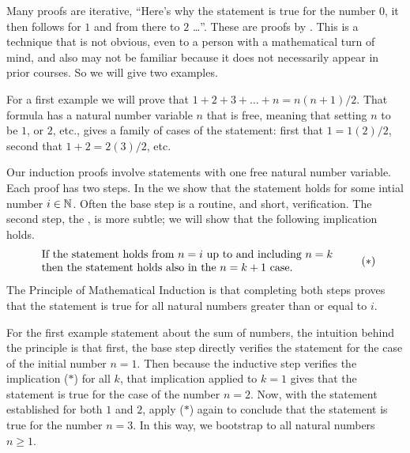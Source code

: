 
Many proofs are iterative,
``Here's why the statement is true for the number \( 0 \), 
it then follows for \( 1 \) and from there to \( 2 \) \ldots''.
These are proofs by 
.
This is a technique that is not obvious, even to a 
person with a mathematical turn of mind, and also may not be familiar because
it does not necessarily appear in prior courses.
So we will give two examples.

For a first example we will prove that \( 1+2+3+\dots+n=n(n+1)/2 \). 
That formula has a natural number variable $n$
that is free, meaning that setting $n$ to be $1$,
or $2$, etc., gives a family of cases of the statement:
first that $1=1(2)/2$, second that $1+2=2(3)/2$, etc.

Our induction proofs involve statements with one free natural number 
variable.
Each proof has two steps. 
In the 
we show that the statement holds for
some intial number $i\in \mathbb{N}$. 
Often the base step is a routine, and short, verification.
The second step, 
the ,
is more subtle; we will show that the following implication holds.
\begin{equation*}
  \begin{tabular}{l}
    \text{If the statement holds from $n=i$ up to and including~$n=k$} 
     \\
    \text{then the statement holds also in the $n=k+1$ case.}
  \end{tabular}
  \tag{$*$}
\end{equation*}
The Principle of Mathematical Induction
is that completing both steps proves that the statement is
true for all natural numbers greater than or equal to $i$.

For the first example statement about the sum of numbers, 
the intuition behind the principle is that first, the base step directly 
verifies the statement for the case of the initial number $n=1$. 
Then because the inductive step verifies the implication ($*$)
for all $k$, that implication applied to $k=1$
gives that the statement is true for the case of the number
$n=2$. 
Now, with the statement established for both $1$ and $2$, 
apply ($*$) again to conclude that the statement is true for the number
$n=3$.
In this way, we bootstrap to all natural numbers $n\geq 1$. 

